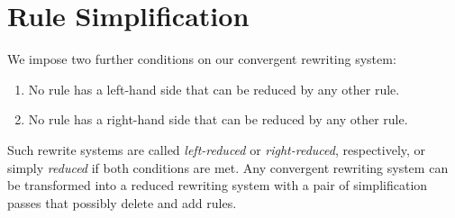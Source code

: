 \documentclass[../generics]{subfiles}
\begin{document}
\newcommand{\AssocIntro}[2]{\protosym{#1}\cdot\texttt{#2}\Rightarrow\assocsym{#1}{#2}}
\newcommand{\AssocIntroInv}[2]{\assocsym{#1}{#2}\Rightarrow\protosym{#1}\cdot\texttt{#2}}

\newcommand{\InheritAssocIntro}[3]{\protosym{#1}\cdot\assocsym{#2}{#3}\Rightarrow\assocsym{#1}{#3}}
\newcommand{\InheritAssocIntroInv}[3]{\assocsym{#1}{#3}\Rightarrow\protosym{#1}\cdot\assocsym{#2}{#3}}

\newcommand{\ProtoConf}[2]{#1\cdot\protosym{#2}\Rightarrow #1}
\newcommand{\ProtoConfInv}[2]{#1\Rightarrow #1\cdot\protosym{#2}}

\newcommand{\ProtoInherit}[2]{\ProtoConf{\protosym{#1}}{#2}}
\newcommand{\ProtoInheritInv}[2]{\ProtoConfInv{\protosym{#1}}{#2}}

\newcommand{\FourLoopDerived}[8]{%
\begin{tikzcd}[ampersand replacement=\&,column sep=1em]%
\&#1\arrow[ld, Rightarrow, "#5"', bend right]\&\\
#2\arrow[rd, Rightarrow, "#6"', bend right, dashed]\&\&#4\arrow[lu, Rightarrow,"#8"', bend right]\\
\&#3\arrow[ru, Rightarrow, "#7"', bend right]\&
\end{tikzcd}}
\newcommand{\FourLoopDerivedOther}[8]{%
\begin{tikzcd}[ampersand replacement=\&,column sep=1em]%
\&#1\arrow[ld, Rightarrow, "#5"', bend right]\&\\
#2\arrow[rd, Rightarrow, "#6"', bend right]\&\&#4\arrow[lu, Rightarrow,"#8"', bend right]\\
\&#3\arrow[ru, Rightarrow, "#7"', bend right, dashed]\&
\end{tikzcd}}
\newcommand{\FourLoopTrivial}[8]{%
\begin{tikzcd}[ampersand replacement=\&,column sep=1em]%
\&#1\arrow[ld, Rightarrow, "#5"', bend right]\&\\
#2\arrow[rd, Rightarrow, "#6"', bend right]\&\&#4\arrow[lu, Rightarrow,"#8"', bend right]\\
\&#3\arrow[ru, Rightarrow, "#7"', bend right]\&
\end{tikzcd}}

\section{Rule Simplification}\label{rule reduction}

We impose two further conditions on our convergent rewriting system:
\begin{enumerate}
\item No rule has a left-hand side that can be reduced by any other rule.
\item No rule has a right-hand side that can be reduced by any other rule.
\end{enumerate}
Such rewrite systems are called \emph{left-reduced} or \emph{right-reduced}, respectively, or simply \emph{reduced} if both conditions are met. Any convergent rewriting system can be transformed into a reduced rewriting system with a pair of simplification passes that possibly delete and add rules.
\end{document}
